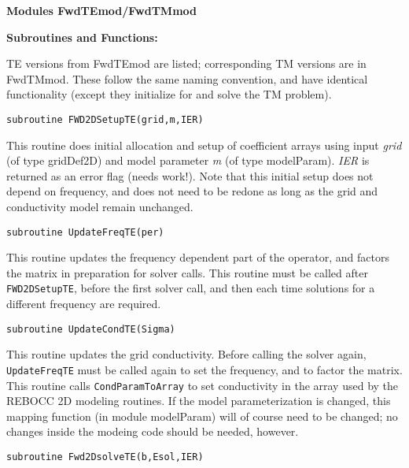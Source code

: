 \documentclass[12pt]{article}
\begin{document}
\vspace{10pt}

\noindent
{\bf Modules FwdTEmod/FwdTMmod}

\vspace{10pt}

\noindent
{\bf Subroutines and Functions:}

\vspace{6pt}

TE versions from FwdTEmod are listed; corresponding TM versions 
are in FwdTMmod.  These follow the same naming convention, and
have identical functionality (except they initialize for and
solve the TM problem).

\begin{verbatim}
subroutine FWD2DSetupTE(grid,m,IER)
\end{verbatim}

This routine does initial allocation and setup of coefficient 
arrays using input {\it grid} (of type gridDef2D) and model
parameter {\it m} (of type modelParam).  {\it IER} is returned as an
error flag (needs work!).  Note that this initial setup does
not depend on frequency, and does not need to be redone
as long as the grid and conductivity model remain unchanged.

\begin{verbatim}
subroutine UpdateFreqTE(per)
\end{verbatim}

This routine updates the frequency dependent part of the operator,
and factors the matrix in preparation for solver calls.  This routine
must be called after \verb|FWD2DSetupTE|, before the first solver call,
and then each time solutions for a different frequency are
required.

\begin{verbatim}
subroutine UpdateCondTE(Sigma)
\end{verbatim}

This routine updates the grid conductivity.
Before calling the solver again, \verb|UpdateFreqTE| must be called again
to set the frequency, and to factor the matrix.  This routine
calls \verb|CondParamToArray| to set conductivity in the array used
by the REBOCC 2D modeling routines.  If the model parameterization
is changed, this mapping function (in module modelParam)
will of course need to be changed; no changes inside the modeing
code should be needed, however.

\begin{verbatim}
subroutine Fwd2DsolveTE(b,Esol,IER)
\end{verbatim}
\end{document}
